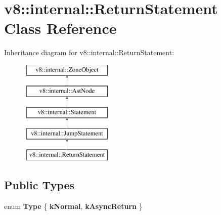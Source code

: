 \hypertarget{classv8_1_1internal_1_1ReturnStatement}{}\section{v8\+:\+:internal\+:\+:Return\+Statement Class Reference}
\label{classv8_1_1internal_1_1ReturnStatement}
Inheritance diagram for v8\+:\+:internal\+:\+:Return\+Statement\+:\begin{figure}[H]
\begin{center}
\leavevmode
\includegraphics[height=5.000000cm]{classv8_1_1internal_1_1ReturnStatement}
\end{center}
\end{figure}
\subsection*{Public Types}
\begin{DoxyCompactItemize}
\item 
\mbox{\label{classv8_1_1internal_1_1ReturnStatement_a5a02677d2bec710b6f59cd33d2eb4a36}} 
enum {\bfseries Type} \{ {\bfseries k\+Normal}, 
{\bfseries k\+Async\+Return}
 \}
\end{DoxyCompactItemize}
